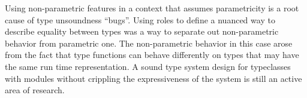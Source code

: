 \documentclass[manuscript,screen,nonacm]{acmart}
\begin{document}
Using non-parametric features in a context that assumes parametricity is a root cause of type unsoundness ``bugs''.
Using roles to define a nuanced way to describe equality between types was a way to separate out non-parametric behavior from parametric one. The non-parametric behavior in this case arose from the fact that type functions can behave differently on types that may have the same run time representation.
A sound type system design for typeclasses with modules without crippling the expressiveness of the system is still an active area of research.

\end{document}
